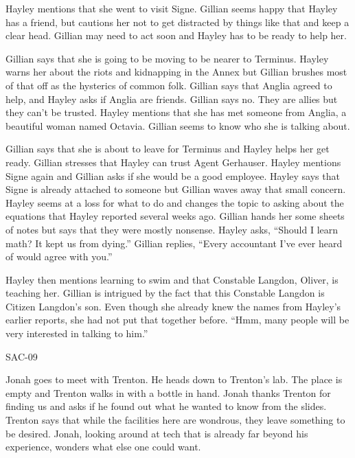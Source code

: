Hayley mentions that she went to visit Signe.  Gillian seems happy that Hayley has a friend, but cautions her not to get distracted by things like that and keep a clear head.  Gillian may need to act soon and Hayley has to be ready to help her.  



Gillian says that she is going to be moving to be nearer to Terminus.  Hayley warns her about the riots and kidnapping in the Annex but Gillian brushes most of that off as the hysterics of common folk.  Gillian says that Anglia agreed to help, and Hayley asks if Anglia are friends.  Gillian says no.  They are allies but they can't be trusted.  Hayley mentions that she has met someone from Anglia, a beautiful woman named Octavia.  Gillian seems to know who she is talking about.



Gillian says that she is about to leave for Terminus and Hayley helps her get ready.  Gillian stresses that Hayley can trust Agent Gerhauser.  Hayley mentions Signe again and Gillian asks if she would be a good employee.  Hayley says that Signe is already attached to someone but Gillian waves away that small concern.  Hayley seems at a loss for what to do and changes the topic to asking about the equations that Hayley reported several weeks ago.  Gillian hands her some sheets of notes but says that they were mostly nonsense.  Hayley asks, ``Should I learn math?  It kept us from dying.''  Gillian replies, ``Every accountant I've ever heard of would agree with you.''



Hayley then mentions learning to swim and that Constable Langdon, Oliver, is teaching her.  Gillian is intrigued by the fact that this Constable Langdon is Citizen Langdon's son.  Even though she already knew the names from Hayley's earlier reports, she had not put that together before. ``Hmm, many people will be very interested in talking to him.''



 {\LARGE SAC-09 } 



Jonah goes to meet with Trenton.  He heads down to Trenton's lab.  The place is empty and Trenton walks in with a bottle in hand.  Jonah thanks Trenton for finding us and asks if he found out what he wanted to know from the slides.  Trenton says that while the facilities here are wondrous, they leave something to be desired.  Jonah, looking around at tech that is already far beyond his experience, wonders what else one could want.



